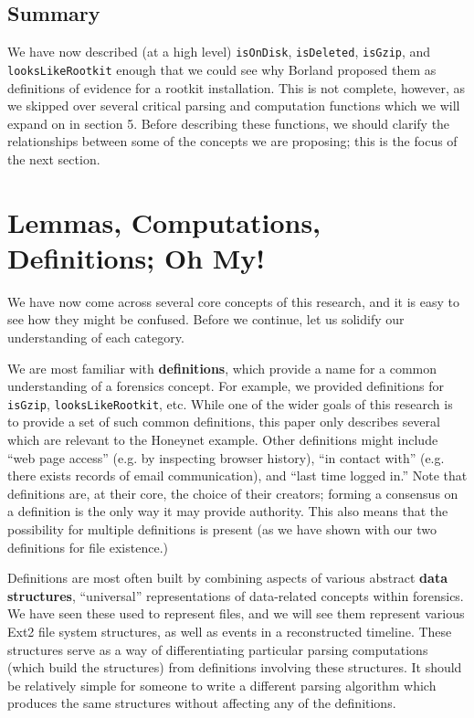 \documentclass[nocopyrightspace]{sigplanconf}
\begin{document}
\subsection{Summary}

We have now described (at a high level) {\tt isOnDisk}, {\tt isDeleted},
{\tt isGzip}, and {\tt looksLikeRootkit} enough that we could see why Borland
proposed them as definitions of evidence for a rootkit installation. This is
not complete, however, as we skipped over several critical parsing and
computation functions which we will expand on in section 5. Before describing
these functions, we should clarify the relationships between some of the
concepts we are proposing; this is the focus of the next section.

\section{Lemmas, Computations, Definitions; Oh My!}

We have now come across several core concepts of this research, and it is easy
to see how they might be confused. Before we continue, let us solidify our
understanding of each category.

We are most familiar with {\bf definitions}, which provide a name for a common
understanding of a forensics concept. For example, we provided definitions for
{\tt isGzip}, {\tt looksLikeRootkit}, etc. While one of the wider goals of
this research is to provide a set of such common definitions, this paper only
describes several which are relevant to the Honeynet example. Other
definitions might include ``web page access'' (e.g. by inspecting browser
history), ``in contact with'' (e.g. there exists records of email
communication), and ``last time logged in.'' Note that definitions are, at
their core, the choice of their creators; forming a consensus on a definition
is the only way it may provide authority. This also means that the possibility
for multiple definitions is present (as we have shown with our two definitions
for file existence.)

Definitions are most often built by combining aspects of various abstract {\bf
data structures}, ``universal'' representations of data-related concepts
within forensics. We have seen these used to represent files, and we will see
them represent various Ext2 file system structures, as well as events in a
reconstructed timeline. These structures serve as a way of differentiating
particular parsing computations (which build the structures) from definitions
involving these structures. It should be relatively simple for someone to
write a different parsing algorithm which produces the same structures without
affecting any of the definitions.
\end{document}
